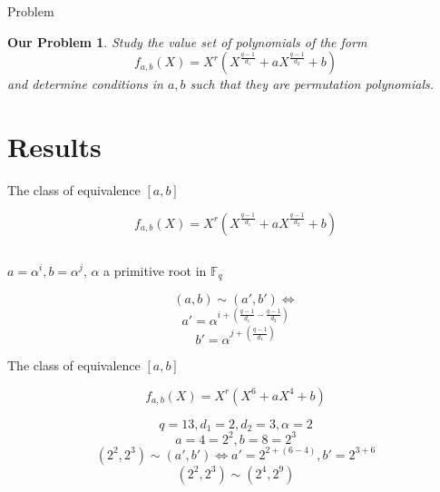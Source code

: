 \documentclass{beamer}
\newtheorem{ourproblem}{Our Problem}
\begin{document}
\begin{frame}{Problem}
  \begin{ourproblem}
    Study the value set of polynomials of the form $$f_{a,b}(X) = X^r(X^{\frac{q-1}{d_1}} + aX^{\frac{q-1}{d_2}} +b)$$ and determine conditions in $a,b$ such that they are permutation polynomials.
  \end{ourproblem}
\end{frame}

\section{Results} %
\label{sec:results}


\begin{frame}{The class of equivalence $[a,b]$}
  
  {\Large $$f_{a,b}(X) = X^r(X^{\frac{q-1}{d_1}} + aX^{\frac{q-1}{d_2}} +b)$$}

  $$$$

  {\Large $a = \alpha^i, b = \alpha^j$, $\alpha$ a primitive root in $\mathbb{F}_q$
    }  \pause
  $$$$

  {\Large $$(a,b) \sim (a', b')
    \Longleftrightarrow$$ }
  \pause
  \linebreak
  {\Large $$a' = \alpha^{i+(\frac{q-1}{d_1} - \frac{q-1}{d_2})}$$}
  \pause
  $$$$ 
  {\Large $$b' = \alpha^{j+(\frac{q-1}{d_1})}$$}

\end{frame}

\begin{frame}{The class of equivalence $[a,b]$}


  {\Large $$f_{a,b}(X) = X^r(X^{6} + aX^{4} +b)$$
  \vspace{0.3cm}

  $$q = 13 , d_1 = 2 , d_2 = 3 , \alpha = 2$$
  \pause
  \vspace{0.3cm}  
  $$a = 4 = 2^2 , b = 8 = 2^3$$
  \pause
  $$(2^2,2^3) \sim (a',b') \Longleftrightarrow a' = 2^{2+(6-4)}, b' = 2^{3+6}$$
  \linebreak \pause
  $$(2^2,2^3) \sim (2^4,2^9)$$}

\end{frame}
\end{document}
